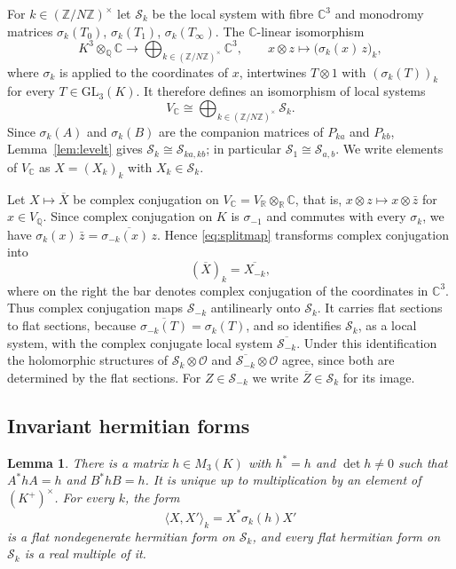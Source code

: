\documentclass[11pt]{amsart}
\newtheorem{lemma}[theorem]{Lemma}
\theoremstyle{definition}
\theoremstyle{remark}
\numberwithin{equation}{section}
\newcommand{\Q}{\mathbb{Q}}
\newcommand{\Z}{\mathbb{Z}}
\newcommand{\C}{\mathbb{C}}
\newcommand{\R}{\mathbb{R}}
\newcommand{\cS}{\mathcal{S}}
\newcommand{\cO}{\mathcal{O}}
\newcommand{\Sab}{\cS_{a,b}}
\begin{document}
For $k\in(\Z/N\Z)^\times$ let $\cS_k$ be the local system with fibre $\C^3$ and monodromy matrices $\sigma_k(T_0)$, $\sigma_k(T_1)$, $\sigma_k(T_\infty)$. The $\C$-linear isomorphism
\begin{equation}\label{eq:splitmap}
K^3\otimes_\Q\C\longrightarrow\bigoplus_{k\in(\Z/N\Z)^\times}\C^3,\qquad x\otimes z\longmapsto\big(\sigma_k(x)\,z\big)_k ,
\end{equation}
where $\sigma_k$ is applied to the coordinates of $x$, intertwines $T\otimes1$ with $(\sigma_k(T))_k$ for every $T\in\mathrm{GL}_3(K)$. It therefore defines an isomorphism of local systems
\begin{equation}\label{eq:split}
V_\C\cong\bigoplus_{k\in(\Z/N\Z)^\times}\cS_k .
\end{equation}
Since $\sigma_k(A)$ and $\sigma_k(B)$ are the companion matrices of $P_{ka}$ and $P_{kb}$, Lemma~\ref{lem:levelt} gives $\cS_k\cong\cS_{ka,kb}$; in particular $\cS_1\cong\Sab$. We write elements of $V_\C$ as $X=(X_k)_k$ with $X_k\in\cS_k$.

Let $X\mapsto\overline X$ be complex conjugation on $V_\C=V_\R\otimes_\R\C$, that is, $x\otimes z\mapsto x\otimes\bar z$ for $x\in V_\Q$. Since complex conjugation on $K$ is $\sigma_{-1}$ and commutes with every $\sigma_k$, we have $\sigma_k(x)\,\bar z=\overline{\sigma_{-k}(x)\,z}$. Hence \eqref{eq:splitmap} transforms complex conjugation into
\begin{equation}\label{eq:conj}
(\overline X)_k=\overline{X_{-k}} ,
\end{equation}
where on the right the bar denotes complex conjugation of the coordinates in $\C^3$. Thus complex conjugation maps $\cS_{-k}$ antilinearly onto $\cS_k$. It carries flat sections to flat sections, because $\overline{\sigma_{-k}(T)}=\sigma_k(T)$, and so identifies $\cS_k$, as a local system, with the complex conjugate local system $\overline{\cS_{-k}}$. Under this identification the holomorphic structures of $\cS_k\otimes\cO$ and $\overline{\cS_{-k}}\otimes\cO$ agree, since both are determined by the flat sections. For $Z\in\cS_{-k}$ we write $\overline Z\in\cS_k$ for its image.

\subsection{Invariant hermitian forms}
\begin{lemma}\label{lem:herm}
There is a matrix $h\in M_3(K)$ with $h^*=h$ and $\det h\ne0$ such that $A^*hA=h$ and $B^*hB=h$. It is unique up to multiplication by an element of $(K^+)^\times$. For every $k$, the form
\[
\langle X,X'\rangle_k=X^*\sigma_k(h)X'
\]
is a flat nondegenerate hermitian form on $\cS_k$, and every flat hermitian form on $\cS_k$ is a real multiple of it.
\end{lemma}
\end{document}
